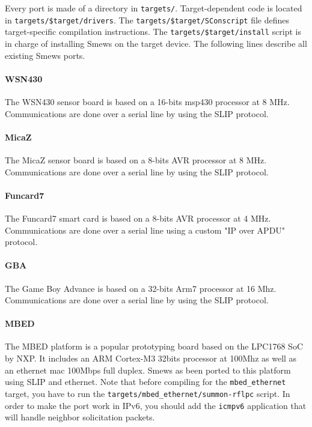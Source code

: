 \documentclass{report}
\begin{document}
Every port is made of a directory in \verb+targets/+. Target-dependent code is located in \verb+targets/$target/drivers+. The \verb+targets/$target/SConscript+ file defines target-specific compilation instructions. The \verb+targets/$target/install+ script is in charge of installing Smews on the target device. The following lines describe all existing Smews ports.

\paragraph{WSN430}

The WSN430 sensor board is based on a 16-bits msp430 processor at 8 MHz. Communications are done over a serial line by using the SLIP protocol.

\paragraph{MicaZ}

The MicaZ sensor board is based on a 8-bits AVR processor at 8 MHz. Communications are done over a serial line by using the SLIP protocol.

\paragraph{Funcard7}

The Funcard7 smart card is based on a 8-bits AVR processor at 4 MHz. Communications are done over a serial line using a custom "IP over APDU" protocol.

\paragraph{GBA}

The Game Boy Advance is based on a 32-bits Arm7 processor at 16 Mhz. Communications are done over a serial line by using the SLIP protocol.

\paragraph{MBED}

The MBED platform is a popular prototyping board based on the LPC1768 SoC by NXP. It includes an ARM Cortex-M3 32bits processor at 100Mhz as well as an ethernet mac 100Mbps full duplex. Smews as been ported to this platform using SLIP and ethernet. Note that before compiling for the \verb+mbed_ethernet+ target, you have to run the \verb+targets/mbed_ethernet/summon-rflpc+ script. In order to make the port work in IPv6, you should add the \verb!icmpv6! application that will handle neighbor solicitation packets.
\end{document}
